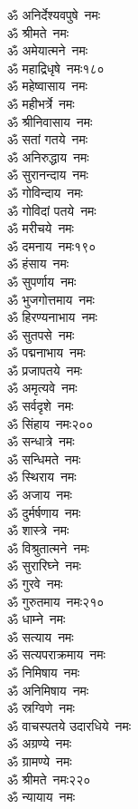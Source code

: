 \begin{multicols}{2}
\begin{flushleft}
ॐ अनिर्देश्यवपुषे~नमः\\
ॐ श्रीमते~नमः\\
ॐ अमेयात्मने~नमः\\
ॐ महाद्रिधृषे~नमः\hfill १८०\\
ॐ महेष्वासाय~नमः\\
ॐ महीभर्त्रे~नमः\\
ॐ श्रीनिवासाय~नमः\\
ॐ सतां गतये~नमः\\
ॐ अनिरुद्धाय~नमः\\
ॐ सुरानन्दाय~नमः\\
ॐ गोविन्दाय~नमः\\
ॐ गोविदां पतये~नमः\\
ॐ मरीचये~नमः\\
ॐ दमनाय~नमः\hfill १९०\\
ॐ हंसाय~नमः\\
ॐ सुपर्णाय~नमः\\
ॐ भुजगोत्तमाय~नमः\\
ॐ हिरण्यनाभाय~नमः\\
ॐ सुतपसे~नमः\\
ॐ पद्मनाभाय~नमः\\
ॐ प्रजापतये~नमः\\
ॐ अमृत्यवे~नमः\\
ॐ सर्वदृशे~नमः\\
ॐ सिंहाय~नमः\hfill २००\\
ॐ सन्धात्रे~नमः\\
ॐ सन्धिमते~नमः\\
ॐ स्थिराय~नमः\\
ॐ अजाय~नमः\\
ॐ दुर्मर्षणाय~नमः\\
ॐ शास्त्रे~नमः\\
ॐ विश्रुतात्मने~नमः\\
ॐ सुरारिघ्ने~नमः\\
ॐ गुरवे~नमः\\
ॐ गुरुतमाय~नमः\hfill २१०\\
ॐ धाम्ने~नमः\\
ॐ सत्याय~नमः\\
ॐ सत्यपराक्रमाय~नमः\\
ॐ निमिषाय~नमः\\
ॐ अनिमिषाय~नमः\\
ॐ स्रग्विणे~नमः\\
ॐ वाचस्पतये उदारधिये~नमः\\
ॐ अग्रण्ये~नमः\\
ॐ ग्रामण्ये~नमः\\
ॐ श्रीमते~नमः\hfill २२०\\
ॐ न्यायाय~नमः\\

\end{flushleft}
\end{multicols}
